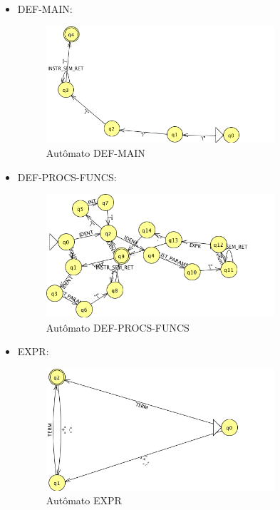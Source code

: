 \begin{itemize}
	\item DEF-MAIN:
	\begin{figure}[H]
		\centering 
		\includegraphics[width=0.8\textwidth]{images/submaquinas/DEF-MAIN.png}  
		\caption{Autômato DEF-MAIN}
	\end{figure}
	
	\item DEF-PROCS-FUNCS:
	\begin{figure}[H]
		\centering 
		\includegraphics[width=0.8\textwidth]{images/submaquinas/DEF-PROCS-FUNCS.png}  
		\caption{Autômato DEF-PROCS-FUNCS}
	\end{figure}
	
	\item EXPR:
	\begin{figure}[H]
		\centering 
		\includegraphics[width=0.8\textwidth]{images/submaquinas/EXPR.png}  
		\caption{Autômato EXPR}
	\end{figure}
	

\end{itemize}
